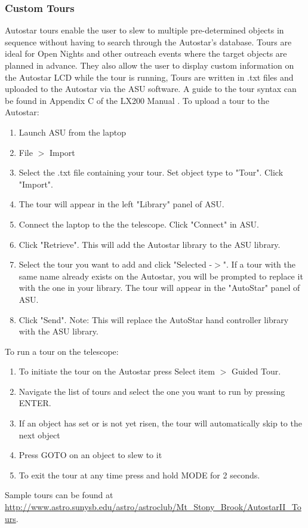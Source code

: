\documentclass[12pt,titlepage]{article}
\begin{document}
\subsubsection{Custom Tours}
Autostar tours enable the user to slew to multiple pre-determined objects in sequence without having to search through the Autostar's database.
Tours are ideal for Open Nights and other outreach events where the target objects are planned in advance.
They also allow the user to display custom information on the Autostar LCD while the tour is running,
Tours are written in .txt files and uploaded to the Autostar via the ASU software.
A guide to the tour syntax can be found in Appendix C of the LX200 Manual \cite{lx200}.
To upload a tour to the Autostar:
\begin{enumerate}
	\item Launch ASU from the laptop
	\item File $>$ Import
	\item Select the .txt file containing your tour. Set object type to "Tour". Click "Import".
	\item The tour will appear in the left "Library" panel of ASU.
	\item Connect the laptop to the the telescope. Click "Connect" in ASU.
	\item Click "Retrieve". This will add the Autostar library to the ASU library.
	\item Select the tour you want to add and click "Selected -$>$".
			If a tour with the same name already exists on the Autostar, you will be prompted to replace it with the one in your library.
			The tour will appear in the "AutoStar" panel of ASU.
	\item Click "Send". Note: This will replace the AutoStar hand controller library with the ASU library.
\end{enumerate}
To run a tour on the telescope:
\begin{enumerate}
	\item To initiate the tour on the Autostar press Select item $>$ Guided Tour.
	\item Navigate the list of tours and select the one you want to run by pressing ENTER.
	\item If an object has set or is not yet risen, the tour will automatically skip to the next object
	\item Press GOTO on an object to slew to it
	\item To exit the tour at any time press and hold MODE for 2 seconds.
\end{enumerate}
Sample tours can be found at \url{http://www.astro.sunysb.edu/astro/astroclub/Mt_Stony_Brook/AutostarII_Tours}.
\end{document}
